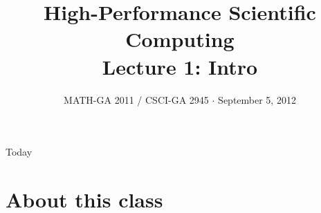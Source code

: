 \documentclass[english,compress]{beamer}
\begin{document}

\title{High-Performance Scientific Computing\\Lecture 1: Intro}

\date{MATH-GA 2011 / CSCI-GA 2945 $\cdot$ September 5, 2012}

\frame{\titlepage}

\begin{frame}{Today}
  \tableofcontents[hideallsubsections]
\end{frame}
\section{About this class}
\end{document}
